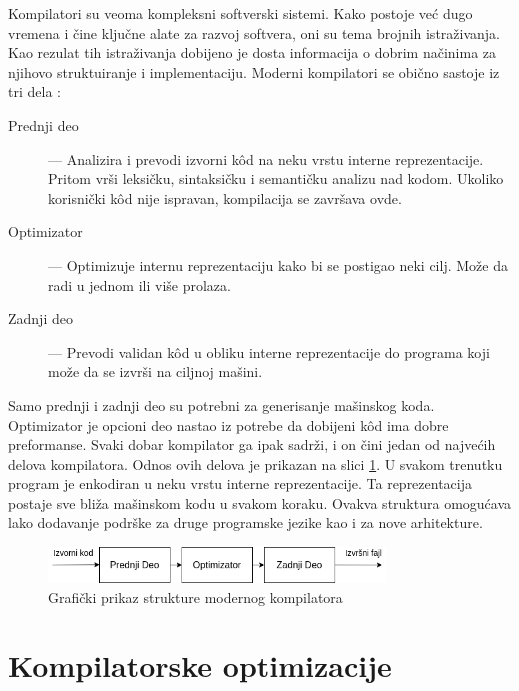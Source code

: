 \documentclass[12pt,oneside]{memoir}
\begin{document}
Kompilatori su veoma kompleksni softverski sistemi.
Kako postoje već dugo vremena i čine ključne alate za razvoj softvera, oni su tema brojnih istraživanja.
Kao rezulat tih istraživanja dobijeno je dosta informacija o dobrim načinima za njihovo struktuiranje i implementaciju.
Moderni kompilatori se obično sastoje iz tri dela \cite{cooper2022engineering}:
\begin{description}
  \item[Prednji deo] --- Analizira i prevodi izvorni k\^od na neku vrstu interne reprezentacije. Pritom vrši leksičku, sintaksičku i semantičku analizu nad kodom. Ukoliko korisnički k\^od nije ispravan, kompilacija se završava ovde.
  \item[Optimizator] --- Optimizuje internu reprezentaciju kako bi se postigao neki cilj. Može da radi u jednom ili više prolaza.
  \item[Zadnji deo] --- Prevodi validan k\^od u obliku interne reprezentacije do programa koji može da se izvrši na ciljnoj mašini.
\end{description}
Samo prednji i zadnji deo su potrebni za generisanje mašinskog koda.
Optimizator je opcioni deo nastao iz potrebe da dobijeni k\^od ima dobre preformanse.
Svaki dobar kompilator ga ipak sadrži, i on čini jedan od najvećih delova kompilatora.
Odnos ovih delova je prikazan na slici \ref{fig:compiler_structure}.
U svakom trenutku program je enkodiran u neku vrstu interne reprezentacije.
Ta reprezentacija postaje sve bliža mašinskom kodu u svakom koraku.
Ovakva struktura omogućava lako dodavanje podrške za druge programske jezike kao i za nove arhitekture.

\begin{figure}[!ht]
  \centering
  \includegraphics[width=0.8\textwidth]{assets/compiler_structure.png}
  \caption{Grafički prikaz strukture modernog kompilatora}
  \label{fig:compiler_structure}
\end{figure}

\section{Kompilatorske optimizacije}

\end{document}
